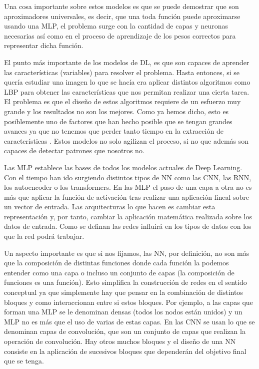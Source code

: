 \documentclass[a4paper,12pt,twoside,titlepage]{article}
\begin{document}
Una cosa importante sobre estos modelos es que se puede demostrar que son aproximadores universales, es decir, que una toda función puede aproximarse usando una MLP, el problema surge con la cantidad de capas y neuronas necesarias así como en el proceso de aprendizaje de los pesos correctos para representar dicha función.

El punto más importante de los modelos de DL, es que son capaces de aprender las características (variables) para resolver el problema. Hasta entonces, si se quería estudiar una imagen lo que se hacía era aplicar distintos algoritmos como LBP para obtener las características que nos permitan realizar una cierta tarea. El problema es que el diseño de estos algoritmos requiere de un esfuerzo muy grande y los resultados no son los mejores. Como ya hemos dicho, esto es posiblemente uno de factores que han hecho posible que se tengan grandes avances ya que no tenemos que perder tanto tiempo en la extracción de características \cite{dl_nature}. Estos modelos no solo agilizan el proceso, si no que además son capaces de detectar patrones que nosotros no.

Las MLP establece las bases de todos los modelos actuales de Deep Learning. Con el tiempo han ido surgiendo distintos tipos de NN como las CNN, las RNN, los autoencoder o los transformers. En las MLP el paso de una capa a otra no es más que aplicar la función de activación tras realizar una aplicación lineal sobre un vector de entrada. Las arquitecturas lo que hacen es cambiar esta representación y, por tanto, cambiar la aplicación matemática realizada sobre los datos de entrada. Como se definan las redes influirá en los tipos de datos con los que la red podrá trabajar. 

Un aspecto importante es que si nos fijamos, las NN, por definición, no son más que la composición de distintas funciones donde cada función la podemos entender como una capa o incluso un conjunto de capas (la composición de funciones es una función). Esto simplifica la construcción de redes en el sentido conceptual ya que simplemente hay que pensar en la combinación de distintos bloques y como interaccionan entre si estos bloques. Por ejemplo, a las capas que forman una MLP se le denominan densas (todos los nodos están unidos) y un MLP no es más que el uso de varias de estas capas. En las CNN se usan lo que se denominan capas de convolución, que son un conjunto de capas que realizan la operación de convolución. Hay otros muchos bloques y el diseño de una NN consiste en la aplicación de sucesivos bloques que dependerán del objetivo final que se tenga.
\end{document}
